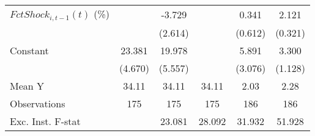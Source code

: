 {\begin{tabular}{l*{5}{c}}
\addlinespace
$ FctShock_{i,t-1}(t)$ (\%)&                     &      -3.729         &                     &       0.341         &       2.121\sym{***}\\
                    &                     &     (2.614)         &                     &     (0.612)         &     (0.321)         \\
\addlinespace
Constant            &      23.381\sym{***}&      19.978\sym{***}&                     &       5.891\sym{*}  &       3.300\sym{**} \\
                    &     (4.670)         &     (5.557)         &                     &     (3.076)         &     (1.128)         \\
\midrule
Mean Y              &       34.11         &       34.11         &       34.11         &        2.03         &        2.28         \\
Observations        &         175         &         175         &         175         &         186         &         186         \\
Exc. Inst. F-stat   &                     &      23.081         &      28.092         &      31.932         &      51.928         \\
\bottomrule
\end{tabular}
}
